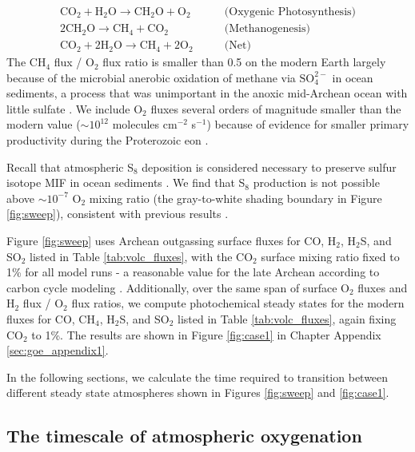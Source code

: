 \begin{equation}
\begin{aligned}
    \mathrm{CO_2} + \mathrm{H_2O} \rightarrow \mathrm{CH_2O} + \mathrm{O_2} \quad\quad &\text{(Oxygenic Photosynthesis)} \\
    2 \mathrm{CH_2O} \rightarrow \mathrm{CH_4} + \mathrm{CO_2} \quad\quad &\text{(Methanogenesis)} \\
    \mathrm{CO_2} + 2\mathrm{H_2O} \rightarrow \mathrm{CH_4} + 2 \mathrm{O_2} \quad\quad &\text{(Net)}
\end{aligned}
\end{equation}
The CH$_4$ flux / O$_2$ flux ratio is smaller than 0.5 on the modern Earth largely because of the microbial anerobic oxidation of methane via $\mathrm{SO_4^{2-}}$ in ocean sediments, a process that was unimportant in the anoxic mid-Archean ocean with little sulfate \citep{Canfield_2000,Catling_2007,Olson_2016}. We include O$_2$ fluxes several orders of magnitude smaller than the modern value ($\sim 10^{12}$ molecules cm$^{-2}$ s$^{-1}$) because of evidence for smaller primary productivity during the Proterozoic eon \citep{Laakso_2019,Kipp_2021}.

Recall that atmospheric S$_8$ deposition is considered necessary to preserve sulfur isotope MIF in ocean sediments \citep{Pavlov_2002}. We find that S$_8$ production is not possible above $\sim10^{-7}$ O$_2$ mixing ratio (the gray-to-white shading boundary in Figure \ref{fig:sweep}), consistent with previous results \citep{Zahnle_2006}.

Figure \ref{fig:sweep} uses Archean outgassing surface fluxes for CO, H$_2$, H$_2$S, and SO$_2$ listed in Table \ref{tab:volc_fluxes}, with the CO$_2$ surface mixing ratio fixed to 1\% for all model runs - a reasonable value for the late Archean according to carbon cycle modeling \citep{KrissansenTotton_2018_carbon}. Additionally, over the same span of surface O$_2$ fluxes and H$_2$ flux / O$_2$ flux ratios, we compute photochemical steady states for the modern fluxes for CO, CH$_4$, H$_2$S, and SO$_2$ listed in Table \ref{tab:volc_fluxes}, again fixing CO$_2$ to 1\%. The results are shown in Figure \ref{fig:case1} in Chapter Appendix \ref{sec:goe_appendix1}.

In the following sections, we calculate the time required to transition between different steady state atmospheres shown in Figures \ref{fig:sweep} and \ref{fig:case1}.

\subsection{The timescale of atmospheric oxygenation} \label{sec:oxygenation}

